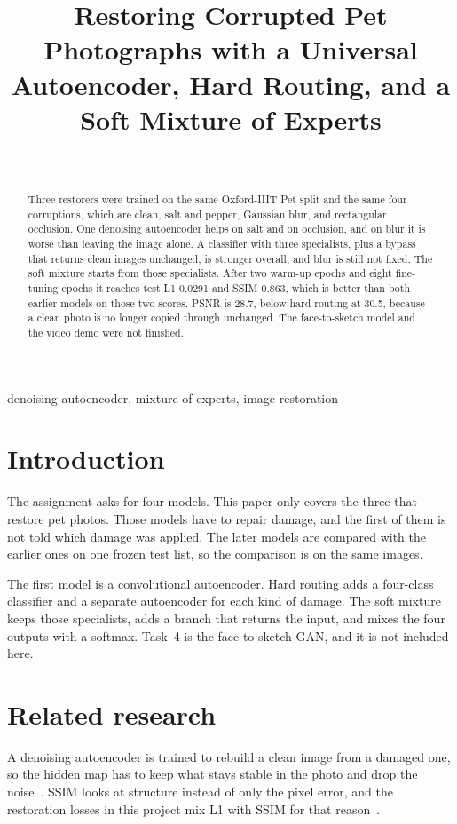 \documentclass[conference]{IEEEtran}
\title{Restoring Corrupted Pet Photographs with a Universal Autoencoder, Hard Routing, and a Soft Mixture of Experts}
\author{\IEEEauthorblockN{Ibraheem Farooq}\\
\IEEEauthorblockA{23i-0816}}
\begin{document}
\maketitle

\begin{abstract}
Three restorers were trained on the same Oxford-IIIT Pet split and the same four corruptions, which are clean, salt and pepper, Gaussian blur, and rectangular occlusion. One denoising autoencoder helps on salt and on occlusion, and on blur it is worse than leaving the image alone. A classifier with three specialists, plus a bypass that returns clean images unchanged, is stronger overall, and blur is still not fixed. The soft mixture starts from those specialists. After two warm-up epochs and eight fine-tuning epochs it reaches test L1 0.0291 and SSIM 0.863, which is better than both earlier models on those two scores. PSNR is 28.7, below hard routing at 30.5, because a clean photo is no longer copied through unchanged. The face-to-sketch model and the video demo were not finished.
\end{abstract}

\begin{IEEEkeywords}
denoising autoencoder, mixture of experts, image restoration
\end{IEEEkeywords}

\section{Introduction}
The assignment asks for four models. This paper only covers the three that restore pet photos. Those models have to repair damage, and the first of them is not told which damage was applied. The later models are compared with the earlier ones on one frozen test list, so the comparison is on the same images.

The first model is a convolutional autoencoder. Hard routing adds a four-class classifier and a separate autoencoder for each kind of damage. The soft mixture keeps those specialists, adds a branch that returns the input, and mixes the four outputs with a softmax. Task~4 is the face-to-sketch GAN, and it is not included here.

\section{Related research}
A denoising autoencoder is trained to rebuild a clean image from a damaged one, so the hidden map has to keep what stays stable in the photo and drop the noise~\cite{vincent2008}. SSIM looks at structure instead of only the pixel error, and the restoration losses in this project mix L1 with SSIM for that reason~\cite{wang2004}.
\end{document}
